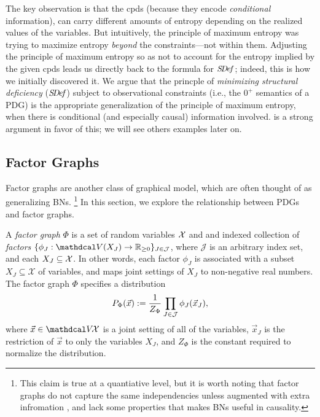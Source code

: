 {The key observation is that the cpds
    (because they encode \emph{conditional} information), 
can carry different amounts of entropy depending on the realized values of the variables. 
But intuitively, the principle of maximum entropy was trying to maximize entropy \emph{beyond} the constraints---not within them. 
Adjusting the principle of maximum entropy so as not to account for the entropy implied by the given cpds leads us directly back to the formula for $\SDef$; indeed, this is how we initially discovered it.
%
We argue that the princple of \emph{minimizing structural deficiency} ($\SDef$) subject to observational constraints (i.e., the $0^+$ semantics of a PDG) is the appropriate generalization of the principle of maximum entropy, when there is conditional (and especially causal) information involved. 
%
 is a strong argument in favor of this;
    we will see others examples later on.
}


\subsection{Factor Graphs} 
    \label{sec:factor-graphs}
Factor graphs 
\citep{kschischang2001sumproduct}
are another class of graphical model, which are often thought of as generalizing BNs.%
    \footnote{This claim is true at a quantiative level, but it is worth noting that factor graphs do not capture the same independencies unless augmented with extra infromation \citep{frey2012extending}, and lack some properties that makes BNs useful in causality.}
In this section, we explore the relationship between PDGs and factor graphs.

\begin{defn}
 A \emph{factor graph} $\Phi$ is a set of random variables
        $\X$ and
    and indexed collection of \emph{factors}
       $\{\phi_J : \V(X_J) \to \mathbb R_{\geq0}\}_{J \in
\mathcal J }$,
where $\mathcal J$ is an arbitrary index set, 
and each $X_J \subseteq \X$.  
In other words, each factor $\phi_J$ is associated with a subset
$X_J\subseteq \mathcal{X}$ of variables, and maps
joint settings of $X_J$ to non-negative real numbers.
The factor graph $\Phi$ specifies a distribution
\[ {\Pr}_{\Phi}(\vec x) := \frac{1}{Z_{\Phi}}
 	\prod_{J \in \cal J} \phi_J(\vec x_J), \]
where $\vec{x} \in \V\!\X$ is a joint setting of all of the variables,
 $\vec{x}_J$ is the restriction of $\vec{x}$ to only the
 variables $X_J$, and $Z_{\Phi}$ is the constant required to
 normalize the distribution.  
\end{defn}

